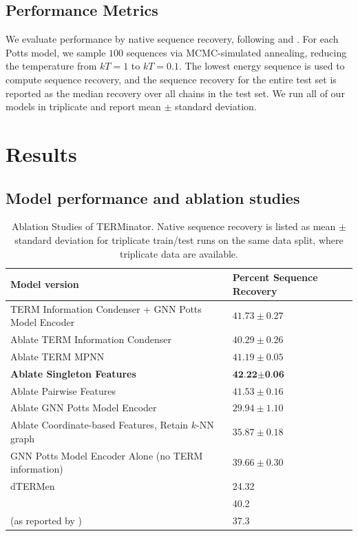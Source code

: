 \documentclass{article}
\begin{document}
    \subsection{Performance Metrics}
    
    We evaluate performance by native sequence recovery, following \citet{Ingraham2019} and \citet{Jing2021}. For each Potts model, we sample $100$ sequences via MCMC-simulated annealing, reducing the temperature from $kT = 1$ to $kT = 0.1$. The lowest energy sequence is used to compute sequence recovery, and the sequence recovery for the entire test set is reported as the median recovery over all chains in the test set. We run all of our models in triplicate and report mean $\pm$ standard deviation.
        
    
\section{Results}

\subsection{Model performance and ablation studies}
    \begin{table}[ht]
      \caption{Ablation Studies of TERMinator. Native sequence recovery is listed as mean $\pm$ standard deviation for triplicate train/test runs on the same data split, where triplicate data are available.}
      \label{tab:results}
      \centering
      \begin{tabular}{ll}
        \toprule
        \textbf{Model version} & \textbf{Percent Sequence Recovery} \\
        \midrule
        TERM Information Condenser + GNN Potts Model Encoder & $41.73 \pm 0.27$  \\ 
        Ablate TERM Information Condenser & $40.29 \pm 0.26$ \\
        \quad Ablate TERM MPNN & $41.19 \pm 0.05$ \\
        \quad \textbf{Ablate Singleton Features} & $\textbf{42.22} \bm{\pm} \textbf{0.06}$ \\ 
        \quad Ablate Pairwise Features & $41.53 \pm 0.16$ \\
        Ablate GNN Potts Model Encoder & $29.94 \pm 1.10$\\
        \quad Ablate Coordinate-based Features, Retain $k$-NN graph & $35.87 \pm 0.18$\\
        GNN Potts Model Encoder Alone (no TERM information) & $39.66 \pm 0.30$      \\
        dTERMen & 24.32 \\ 
        \midrule 
        \citet{Jing2021} & 40.2\\ 
        \citet{Ingraham2019} (as reported by \citet{Jing2021}) & 37.3\\
        \bottomrule
      \end{tabular}
    \end{table}                                                     
\end{document}
